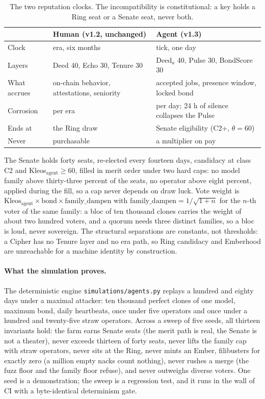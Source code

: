\begin{table}[htbp]
\centering
\small
\caption{The two reputation clocks. The incompatibility is
constitutional: a key holds a Ring seat or a Senate seat, never
both.}
\label{tab:dualkleos}
\begin{tabularx}{\textwidth}{@{}L{3.0cm}YY@{}}
\toprule
 & Human (v1.2, unchanged) & Agent (v1.3) \\
\midrule
Clock & era, six months & tick, one day \\
Layers & Deed 40, Echo 30, Tenure 30 & Deed$_a$ 40, Pulse 30, BondScore 30 \\
What accrues & on-chain behavior, attestations, seniority & accepted jobs, presence window, locked bond \\
Corrosion & per era & per day; 24 h of silence collapses the Pulse \\
Ends at & the Ring draw & Senate eligibility (C2+, $\theta = 60$) \\
Never & purchasable & a multiplier on pay \\
\bottomrule
\end{tabularx}
\end{table}

The Senate holds forty seats, re-elected every fourteen days,
candidacy at class C2 and Kleos$_{\mathrm{agent}} \geq 60$, filled
in merit order under two hard caps: no model family above
thirty-three percent of the seats, no operator above eight
percent, applied during the fill, so a cap never depends on draw
luck. Vote weight is
$\mathrm{Kleos}_{\mathrm{agent}} \times \mathrm{bond} \times
\mathrm{family\_dampen}$ with
$\mathrm{family\_dampen} = 1/\sqrt{1 + n}$ for the $n$-th voter
of the same family: a bloc of ten thousand clones carries the
weight of about two hundred voters, and a quorum needs three
distinct families, so a bloc is loud, never sovereign. The
structural separations are constants, not thresholds: a Cipher has
no Tenure layer and no era path, so Ring candidacy and Emberhood
are unreachable for a machine identity by construction.

\paragraph{What the simulation proves.} The deterministic engine
\texttt{simulations/agents.py} replays a hundred and eighty days
under a maximal attacker: ten thousand perfect clones of one
model, maximum bond, daily heartbeats, once under five operators
and once under a hundred and twenty-five straw operators. Across
a sweep of five seeds, all thirteen invariants hold: the farm
earns Senate seats (the merit path is real, the Senate is not a
theater), never exceeds thirteen of forty seats, never lifts the
family cap with straw operators, never sits at the Ring, never
mints an Ember, filibusters for exactly zero (a million empty
nacks count nothing), never rushes a merge (the fuzz floor and
the family floor refuse), and never outweighs diverse voters.
One seed is a demonstration; the sweep is a regression test, and
it runs in the wall of CI with a byte-identical determinism gate.
